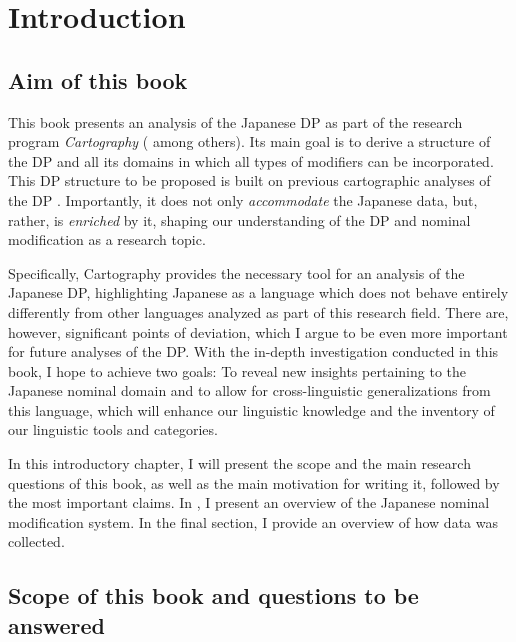\chapter{Introduction} \label{chapter introduction}

\section{Aim of this book}

This book presents an analysis of the Japanese DP as part of the research program \textit{Cartography} (\citealt{pollock:1989:verb, cinque:1993:evidence, rizzi:1997:the, cinque:1999:adverbs, cinque:2006:complement, cinque:2010:adj, cinque:2017:micro, cinque:2020:relcl, cinque:2023:linearization} among others). Its main goal is to derive a structure of the DP and all its domains in which all types of modifiers can be incorporated. This DP structure to be proposed is built on previous cartographic analyses of the DP \citep{cinque:1993:evidence, cinque:2010:adj, cinque:2020:relcl, svenonius:2008:position, laenzlinger:2005:french, laenzlinger:2011:elements, kim:2019:syntax}. Importantly, it does not only \textit{accommodate} the Japanese data, but, rather, is \textit{enriched} by it, shaping our understanding of the DP and nominal modification as a research topic.

Specifically, Cartography provides the necessary tool for an analysis of the Japanese DP, highlighting Japanese as a language which does not behave entirely differently from other languages analyzed as part of this research field. There are, however, significant points of deviation, which I argue to be even more important for future analyses of the DP. With the in-depth investigation conducted in this book, I hope to achieve two goals: To reveal new insights pertaining to the Japanese nominal domain and to allow for cross-linguistic generalizations from this language, which will enhance our linguistic knowledge and the inventory of our linguistic tools and categories.

In this introductory chapter, I will present the scope and the main research questions of this book, as well as the main motivation for writing it, followed by the most important claims. In , I present an overview of the Japanese nominal modification system. In the final section, I provide an overview of how data was collected.


\section{Scope of this book and questions to be answered}

